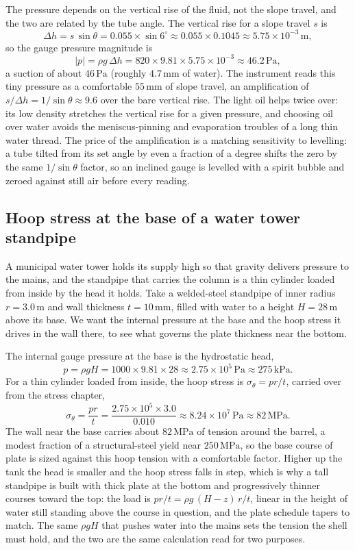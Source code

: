 The pressure depends on the vertical rise of the fluid, not the slope
travel, and the two are related by the tube angle. The vertical rise for a
slope travel $s$ is
\[
\Delta h = s\,\sin\theta = 0.055 \times \sin 6^{\circ}
\approx 0.055 \times 0.1045 \approx 5.75 \times 10^{-3}\,\si{\meter},
\]
so the gauge pressure magnitude is
\[
|p| = \rho g\,\Delta h
= 820 \times 9.81 \times 5.75 \times 10^{-3}
\approx 46.2\,\text{Pa},
\]
a suction of about $46\,\text{Pa}$ (roughly $4.7\,\si{\milli\meter}$ of
water). The instrument reads this tiny pressure as a comfortable
$55\,\si{\milli\meter}$ of slope travel, an amplification of $s/\Delta h =
1/\sin\theta \approx 9.6$ over the bare vertical rise. The light oil helps
twice over: its low density stretches the vertical rise for a given
pressure, and choosing oil over water avoids the meniscus-pinning and
evaporation troubles of a long thin water thread. The price of the
amplification is a matching sensitivity to levelling: a tube tilted from
its set angle by even a fraction of a degree shifts the zero by the same
$1/\sin\theta$ factor, so an inclined gauge is levelled with a spirit
bubble and zeroed against still air before every reading.

\subsection{Hoop stress at the base of a water tower standpipe}

A municipal water tower holds its supply high so that gravity delivers
pressure to the mains, and the standpipe that carries the column is a thin
cylinder loaded from inside by the head it holds. Take a welded-steel
standpipe of inner radius $r = 3.0\,\si{\meter}$ and wall thickness $t =
10\,\si{\milli\meter}$, filled with water to a height $H = 28\,\si{\meter}$
above its base. We want the internal pressure at the base and the hoop
stress it drives in the wall there, to see what governs the plate
thickness near the bottom.

The internal gauge pressure at the base is the hydrostatic head,
\[
p = \rho g H = 1000 \times 9.81 \times 28
\approx 2.75 \times 10^5\,\text{Pa}
\approx 275\,\text{kPa}.
\]
For a thin cylinder loaded from inside, the hoop stress is $\sigma_\theta =
p r/t$, carried over from the stress chapter,
\[
\sigma_\theta = \frac{p r}{t}
= \frac{2.75 \times 10^5 \times 3.0}{0.010}
\approx 8.24 \times 10^7\,\text{Pa}
\approx 82\,\text{MPa}.
\]
The wall near the base carries about $82\,\text{MPa}$ of tension around the
barrel, a modest fraction of a structural-steel yield near
$250\,\text{MPa}$, so the base course of plate is sized against this hoop
tension with a comfortable factor. Higher up the tank the head is smaller
and the hoop stress falls in step, which is why a tall standpipe is built
with thick plate at the bottom and progressively thinner courses toward the
top: the load is $p r/t = \rho g\,(H - z)\,r/t$, linear in the height of
water still standing above the course in question, and the plate schedule
tapers to match. The same $\rho g H$ that pushes water into the mains sets
the tension the shell must hold, and the two are the same calculation read
for two purposes.

